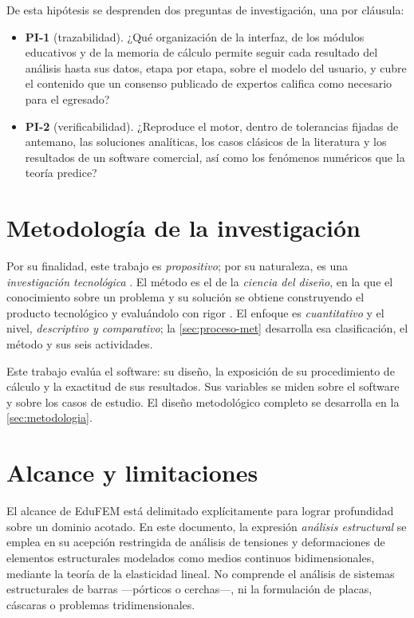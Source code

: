 De esta hipótesis se desprenden dos preguntas de investigación, una por cláusula:

\begin{itemize}
    \item \textbf{PI-1} (trazabilidad). ¿Qué organización de la interfaz, de los módulos educativos y de la memoria de cálculo permite seguir cada resultado del análisis hasta sus datos, etapa por etapa, sobre el modelo del usuario, y cubre el contenido que un consenso publicado de expertos califica como necesario para el egresado?
    \item \textbf{PI-2} (verificabilidad). ¿Reproduce el motor, dentro de tolerancias fijadas de antemano, las soluciones analíticas, los casos clásicos de la literatura y los resultados de un software comercial, así como los fenómenos numéricos que la teoría predice?
\end{itemize}

\section*{Metodología de la investigación}

Por su finalidad, este trabajo es \emph{propositivo}; por su naturaleza, es una \emph{investigación tecnológica} \autocite[p.~91]{garciacordoba2005tecnologica}. El método es el de la \emph{ciencia del diseño}, en la que el conocimiento sobre un problema y su solución se obtiene construyendo el producto tecnológico y evaluándolo con rigor \autocite[pp.~75, 83]{hevner2004design}. El enfoque es \emph{cuantitativo} y el nivel, \emph{descriptivo y comparativo}; la \autoref{sec:proceso-met} desarrolla esa clasificación, el método y sus seis actividades.

Este trabajo evalúa el software: su diseño, la exposición de su procedimiento de cálculo y la exactitud de sus resultados. Sus variables se miden sobre el software y sobre los casos de estudio. El diseño metodológico completo se desarrolla en la \autoref{sec:metodologia}.

\section*{Alcance y limitaciones}

El alcance de EduFEM está delimitado explícitamente para lograr profundidad sobre un dominio acotado. En este documento, la expresión \emph{análisis estructural} se emplea en su acepción restringida de análisis de tensiones y deformaciones de elementos estructurales modelados como medios continuos bidimensionales, mediante la teoría de la elasticidad lineal. No comprende el análisis de sistemas estructurales de barras —pórticos o cerchas—, ni la formulación de placas, cáscaras o problemas tridimensionales.

